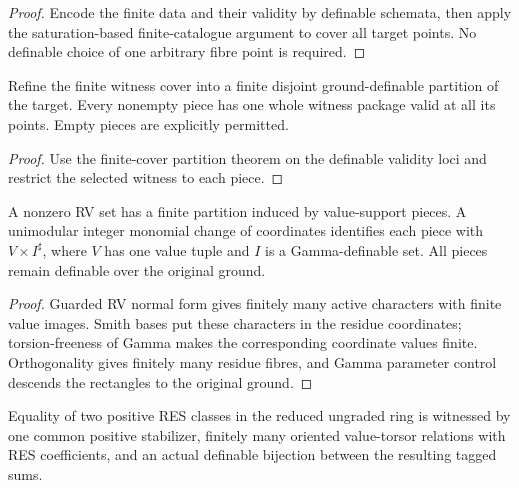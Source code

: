 \begin{proof}
Encode the finite data and their validity by definable schemata, then apply the saturation-based finite-catalogue argument to cover all target points. No definable choice of one arbitrary fibre point is required.
\end{proof}

\begin{lemma}
\label{partition}
\leanok
{}
Refine the finite witness cover into a finite disjoint ground-definable partition of the target. Every nonempty piece has one whole witness package valid at all its points. Empty pieces are explicitly permitted.
\end{lemma}

\begin{proof}
Use the finite-cover partition theorem on the definable validity loci and restrict the selected witness to each piece.
\end{proof}

\begin{lemma}
\label{monomial}
\leanok
{}
A nonzero RV set has a finite partition induced by value-support pieces. A unimodular integer monomial change of coordinates identifies each piece with $V\times I^\sharp$, where $V$ has one value tuple and $I$ is a Gamma-definable set. All pieces remain definable over the original ground.
\end{lemma}

\begin{proof}
Guarded RV normal form gives finitely many active characters with finite value images. Smith bases put these characters in the residue coordinates; torsion-freeness of Gamma makes the corresponding coordinate values finite. Orthogonality gives finitely many residue fibres, and Gamma parameter control descends the rectangles to the original ground.
\end{proof}

\begin{lemma}
\label{res-witness}
\leanok
{}
Equality of two positive RES classes in the reduced ungraded ring is witnessed by one common positive stabilizer, finitely many oriented value-torsor relations with RES coefficients, and an actual definable bijection between the resulting tagged sums.
\end{lemma}

